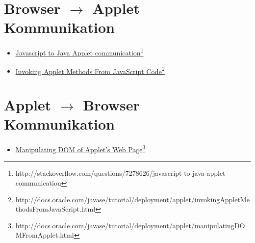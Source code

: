 \documentclass[dvips,12pt,a4paper]{article}
\newcommand{\myul}[1]{\ul{#1}}
\newcommand{\jsToAppletComUrlA}{\mbox{http://stackoverflow.com/questions/7278626/javascript-to-java-applet-communication}}
\newcommand{\jsToAppletComUrlB}{\mbox{http://docs.oracle.com/javase/tutorial/deployment/applet/invokingAppletMethodsFromJavaScript.html}}
\newcommand{\appletToDom}{\mbox{http://docs.oracle.com/javase/tutorial/deployment/applet/manipulatingDOMFromApplet.html}}
\begin{document}
\clearpage
\begin{appendix}
\section{Browser $\rightarrow$ Applet Kommunikation}\label{btoacom}
\begin{itemize}
  \item \href{\jsToAppletComUrlA}{\myul{Javascript to Java Applet communication}}\footnote{\jsToAppletComUrlA}
  \item \href{\jsToAppletComUrlB}{\myul{Invoking Applet Methods From JavaScript Code}}\footnote{\jsToAppletComUrlB}
\end{itemize}
\section{Applet $\rightarrow$ Browser Kommunikation}
\begin{itemize}
  \item \href{\appletToDom}{\myul{Manipulating DOM of Applet's Web Page}}\footnote{\appletToDom}
\end{itemize}
\end{appendix}
\end{document}
